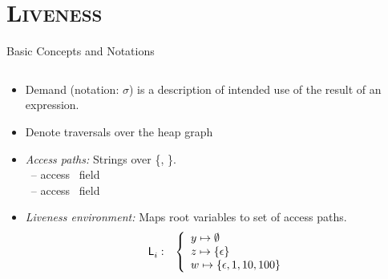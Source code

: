 \documentclass[xcolor=x11names,compress,mathserif]{beamer}
\renewcommand{\(}{\begin{columns}}
\renewcommand{\)}{\end{columns}}
\newcommand{\<}[1]{\begin{column}{#1}}
\renewcommand{\>}{\end{column}}
\begin{document}
\section{\scshape Liveness}
\begin{frame}{Basic Concepts and Notations}
\small
\begin{columns}
  \begin{column}[T]{0.75\textwidth}
    \begin{itemize}\itemsep0.75em
    \item  Demand  (notation: $\sigma$) is a description  of intended use
      of the result of an expression.
    \item Denote traversals over the heap graph    
    \item {\em Access paths:} Strings over \{\acar, \acdr\}.\\
      \hspace*{.25cm}   \acar\  -- access \CAR\ field \\
      \hspace*{.25cm}   \acdr\  -- access \CDR\ field 
    \item {\em Liveness environment:} 
      Maps root variables    to set of access paths.
            \begin{eqnarray*}
              \mathsf{L}_{{i}}^{}&:&
              \left\{\begin{array}{l}
              y \mapsto \emptyset\\
              z \mapsto \{\epsilon\}\\
              w \mapsto \{\epsilon, 1, 10, 100\}
              \end{array}\right.
            \end{eqnarray*}
    \end{itemize}
  \end{column}
\end{columns}

\bigskip
\bigskip

\end{frame}

\end{document}

